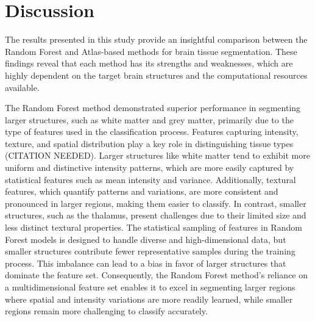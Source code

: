 \section{Discussion}
The results presented in this study provide an insightful comparison between the Random Forest and Atlas-based methods for brain tissue segmentation. These findings reveal that each method has its strengths and weaknesses, which are highly dependent on the target brain structures and the computational resources available.

The Random Forest method demonstrated superior performance in segmenting larger structures, such as white matter and grey matter, primarily due to the type of features used in the classification process. Features capturing intensity, texture, and spatial distribution play a key role in distinguishing tissue types (CITATION NEEDED). Larger structures like white matter tend to exhibit more uniform and distinctive intensity patterns, which are more easily captured by statistical features such as mean intensity and variance. Additionally, textural features, which quantify patterns and variations, are more consistent and pronounced in larger regions, making them easier to classify. In contrast, smaller structures, such as the thalamus, present challenges due to their limited size and less distinct textural properties. The statistical sampling of features in Random Forest models is designed to handle diverse and high-dimensional data, but smaller structures contribute fewer representative samples during the training process. This imbalance can lead to a bias in favor of larger structures that dominate the feature set. Consequently, the Random Forest method's reliance on a multidimensional feature set enables it to excel in segmenting larger regions where spatial and intensity variations are more readily learned, while smaller regions remain more challenging to classify accurately.

